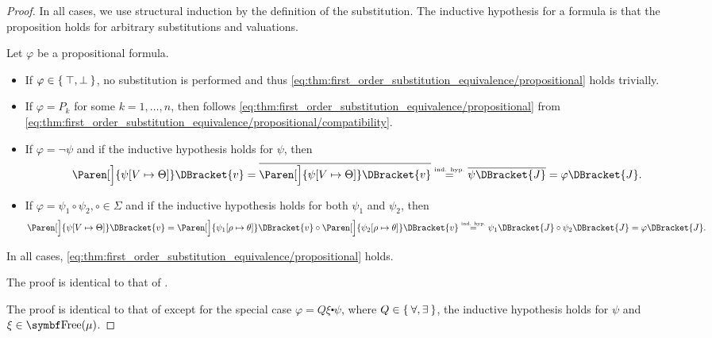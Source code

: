 \begin{proof}
  In all cases, we use structural induction by the definition of the substitution\IND. The inductive hypothesis for a formula is that the proposition holds for arbitrary substitutions and valuations.

   Let \( \varphi \) be a propositional formula.
  \begin{itemize}
    \item If \( \varphi \in \Set{ \top, \bot } \), no substitution is performed and thus \eqref{eq:thm:first_order_substitution_equivalence/propositional} holds trivially.

    \item If \( \varphi = P_k \) for some \( k = 1, \ldots, n \), then follows \eqref{eq:thm:first_order_substitution_equivalence/propositional} from \eqref{eq:thm:first_order_substitution_equivalence/propositional/compatibility}.

    \item If \( \varphi = \neg \psi \) and if the inductive hypothesis holds for \( \psi \), then
    \begin{equation*}
      \Paren[\Big]{ \psi[V \mapsto \Theta] }\DBracket{v}
      =
      \Ol{\Paren[\Big]{ \psi[V \mapsto \Theta] }\DBracket{v}}
      \overset {\IndHyp} =
      \Ol{\psi \DBracket{J}}
      =
      \varphi \DBracket{J}.
    \end{equation*}

    \item If \( \varphi = \psi_1 \circ \psi_2, \circ \in \Sigma \) and if the inductive hypothesis holds for both \( \psi_1 \) and \( \psi_2 \), then
    \begin{equation*}
      \Paren[\Big]{ \psi[V \mapsto \Theta] }\DBracket{v}
      =
      \Paren[\Big]{ \psi_1[\rho \mapsto \theta] }\DBracket{v} \circ \Paren[\Big]{ \psi_2[\rho \mapsto \theta] }\DBracket{v}
      \overset {\IndHyp} =
      \psi_1 \DBracket{J} \circ \psi_2\DBracket{J}
      =
      \varphi\DBracket{J}.
    \end{equation*}
  \end{itemize}

  In all cases, \eqref{eq:thm:first_order_substitution_equivalence/propositional} holds.

   The proof is identical to that of .

   The proof is identical to that of  except for the special case \( \varphi = Q \xi \centerdot \psi \), where \( Q \in \Set{ \forall, \exists } \), the inductive hypothesis holds for \( \psi \) and \( \xi \in \Bold{Free}(\mu) \).


\end{proof}
